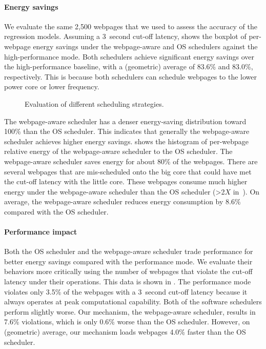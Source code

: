 \paragraph{Energy savings} We evaluate the same 2,500 webpages that we used to assess the accuracy of the regression models. Assuming a 3~second cut-off latency,  shows the boxplot of per-webpage energy savings under the webpage-aware and OS schedulers against the high-performance mode. Both schedulers achieve significant energy savings over the high-performance baseline, with a (geometric) average of 83.6\% and 83.0\%, respectively. This is because both schedulers can schedule webpages to the lower power core or lower frequency.

\begin{figure}[t]
\hspace*{15pt}
\caption{Evaluation of different scheduling strategies.}
\label{fig:sched_results}
\end{figure}

The webpage-aware scheduler has a denser energy-saving distribution toward 100\% than the OS scheduler. This indicates that generally the webpage-aware scheduler achieves higher energy savings.  shows the histogram of per-webpage relative energy of the webpage-aware scheduler to the OS scheduler. The webpage-aware scheduler saves energy for about 80\% of the webpages. There are several webpages that are mis-scheduled onto the big core that could have met the cut-off latency with the little core. These webpages consume much higher energy under the webpage-aware scheduler than the OS scheduler (\textgreater 2$X$ in~).  On average, the webpage-aware scheduler reduces energy consumption by 8.6\% compared with the OS scheduler.

\paragraph{Performance impact} Both the OS scheduler and the webpage-aware scheduler trade performance for better energy savings compared with the performance mode. We evaluate their behaviors more critically using the number of webpages that violate the cut-off latency under their operations. This data is shown in . The performance mode violates only 3.5\% of the webpages with a 3~second cut-off latency because it always operates at peak computational capability. Both of the software schedulers perform slightly worse. Our mechanism, the webpage-aware scheduler, results in 7.6\% violations, which is only 0.6\% worse than the OS scheduler. However, on (geometric) average, our mechanism loads webpages 4.0\% faster than the OS scheduler.

